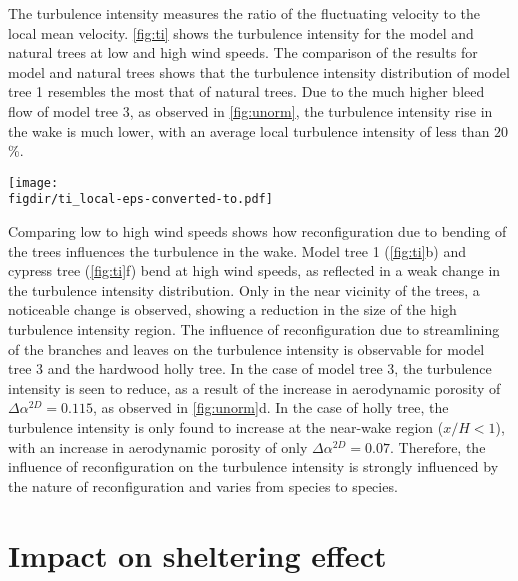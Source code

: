 The turbulence intensity measures the ratio of the fluctuating velocity to the local mean velocity. \cref{fig:ti} shows the turbulence intensity for the model and natural trees at low and high wind speeds. The comparison of the results for model and natural trees shows that the turbulence intensity distribution of model tree 1 resembles the most that of natural trees. Due to the much higher bleed flow of model tree 3, as observed in \cref{fig:unorm}, the turbulence intensity rise in the wake is much lower, with an average local turbulence intensity of less than $20$\%.

	\begin{sidewaysfigure}[p]
	\centering
	\texttt{[image: \\figdir/ti\_local-eps-converted-to.pdf]}
	\caption{Turbulence intensity $I=\sqrt{2/3 k}/\tavg{\mvec{u}}$ (\%) of  model tree 1,  model tree 3,  cypress and  holly. The comparison is done for two wind speeds:  $U_{\textit{ref}}=1$ m\,s$^{-1}$ and  $U_{\textit{ref}}=10$ m\,s$^{-1}$.}
	\label{fig:ti}
	\end{sidewaysfigure}

Comparing low to high wind speeds shows how reconfiguration due to bending of the trees influences the turbulence in the wake. Model tree 1 (\cref{fig:ti}b) and cypress tree (\cref{fig:ti}f) bend at high wind speeds, as reflected in a weak change in the turbulence intensity distribution. Only in the near vicinity of the trees, a noticeable change is observed, showing a reduction in the size of the high turbulence intensity region. The influence of reconfiguration due to streamlining of the branches and leaves on the turbulence intensity is observable for model tree 3 and the hardwood holly tree. In the case of model tree 3, the turbulence intensity is seen to reduce, as a result of the increase in aerodynamic porosity of $\Delta \alpha^{\textit{2D}} = 0.115$, as observed in \cref{fig:unorm}d. In the case of holly tree, the turbulence intensity is only found to increase at the near-wake region ($x/H<1$), with an increase in aerodynamic porosity of only $\Delta \alpha^{\textit{2D}} = 0.07$. Therefore, the influence of reconfiguration on the turbulence intensity is strongly influenced by the nature of reconfiguration and varies from species to species.


\section{Impact on sheltering effect}

